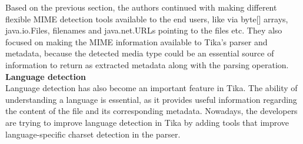 \documentclass{article}
\begin{document}
Based on the previous section, the authors continued with making different flexible MIME detection tools available to the end users, like via byte[] arrays, java.io.Files, filenames and java.net.URLs pointing to the files etc. They  also focused on making the MIME information available to Tika’s parser and metadata, because the detected media type could be an essential source of information to return as extracted metadata along with the parsing operation.\\

\textbf{Language detection}\\

Language detection has also become an important feature in Tika. The ability of understanding a language is essential, as it provides useful information regarding the content of the file and its corresponding metadata. Nowadays, the developers are trying to improve language detection in Tika by adding tools that improve language-specific charset detection in the parser.\\
\end{document}
